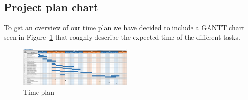 \subsection{Project plan chart}
To get an overview of our time plan we have decided to include a GANTT chart seen in Figure~\ref{fig:time-plan} that roughly describe the expected time of the different tasks.

\newpage
\begin{figure}[H]
  \centering
  \vspace*{-1.0cm}
  \includegraphics[angle=90, width=0.5\textwidth]{figure/time-plan.png}
  \caption{Time plan}
  \label{fig:time-plan}
\end{figure}

